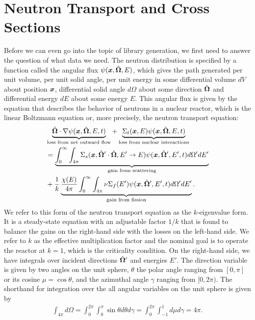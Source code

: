 \section{Neutron Transport and Cross Sections}

Before we can even go into the topic of library generation, we first need to answer the question of what data we need. The neutron distribution is specified by a function called the angular flux $\psi(\bm{x},\hat{\mathbf{\Omega}},E)$, which gives the path generated per unit volume, per unit solid angle, per unit energy in some differential volume $dV$ about position $\bm{x}$, differential solid angle $d\Omega$ about some direction $\hat{\mathbf{\Omega}}$ and differential energy $dE$ about some energy $E$. This angular flux is given by the equation that describes the behavior of neutrons in a nuclear reactor, which is the linear Boltzmann equation or, more precisely, the neutron transport equation:
\begin{align} \label{Eq:neutronics_neutronTransportEquation_kEigenvalue_labeled}
  &\underbrace{\hat{\mathbf{\Omega}} \cdot \nabla \psi(\bm{x},\hat{\mathbf{\Omega}},E,t)}_\text{loss from net outward flow} + \underbrace{\Sigma_t(\bm{x},E) \psi( \bm{x} , \hat{\mathbf{\Omega}}, E, t )}_\text{loss from nuclear interactions}  \nonumber \\*
  &= \underbrace{\int_0^\infty \int_{4\pi}  \Sigma_s(\bm{x},\hat{\mathbf{\Omega}}' \cdot \hat{\mathbf{\Omega}}, E' \rightarrow E ) \psi( \bm{x} , \hat{\mathbf{\Omega}}', E', t ) d\Omega' dE'}_\text{gain from scattering} \nonumber \\*
  &+ \frac{1}{k} \underbrace{\frac{\chi(E)}{4\pi} \int_0^\infty \int_{4\pi} \nu \Sigma_f(E') \psi( \bm{x} , \hat{\mathbf{\Omega}}', E', t ) d\Omega' dE' }_\text{gain from fission} .
\end{align}
We refer to this form of the neutron transport equation as the $k$-eigenvalue form. It is a steady-state equation with an adjustable factor $1/k$ that is found to balance the gains on the right-hand side with the losses on the left-hand side. We refer to $k$ as the effective multiplication factor and the nominal goal is to operate the reactor at $k = 1$, which is the criticality condition. On the right-hand side, we have integrals over incident directions $\hat{\mathbf{\Omega}}'$ and energies $E'$. The direction variable is given by two angles on the unit sphere, $\theta$ the polar angle ranging from $[0,\pi]$ or its cosine $\mu = \cos\theta$, and the azimuthal angle $\gamma$ ranging from $[0,2\pi)$. The shorthand for integration over the all angular variables on the unit sphere is given by
\begin{align}
  \int_{4\pi} d\Omega = \int_0^{2\pi} \int_0^\pi \sin\theta d\theta d\gamma =  \int_0^{2\pi} \int_{-1}^1 d\mu d\gamma = 4\pi.
\end{align}

